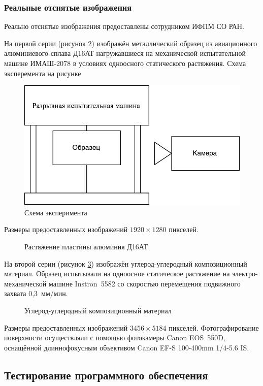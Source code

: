 \subsubsection{Реальные отснятые изображения}

Реально отснятые изображения предоставлены сотрудником ИФПМ СО РАН. 

На первой серии (рисунок \ref{pic:al_deform}) изображён металлический образец из авиационного алюминиевого сплава Д16АТ нагружавшиеся на механической испытательной машине ИМАШ-2078 в условиях одноосного статического растяжения. Схема эксперемента на рисунке 
\begin{figure}
\centering
\includegraphics[width=0.7\linewidth]{images/gap_mach-crop.pdf}
\caption{Схема эксперимента}
\label{fig:gap_mach}
\end{figure}
Размеры предоставленных изображений $1920\times1280$ пикселей.
\begin{figure}[ht]
\caption{Растяжение пластины алюминия Д16АТ}
\label{pic:al_deform}
\end{figure}

На второй серии (рисунок \ref{pic:carbon_deform}) изображён углерод-углеродный композиционный материал. Образец испытывали на одноосное статическое растяжение на электро-механической машине Instron 5582 со скоростью перемещения подвижного захвата 0,3 мм/мин.
\begin{figure}[h!]
\caption{Углерод-углеродный композиционный материал}
\label{pic:carbon_deform}
\end{figure}
Размеры предоставленных изображений $3456\times5184$ пикселей.
Фотографирование поверхности осуществляли с помощью фотокамеры Canon EOS 550D, оснащённой длиннофокусным объективом Canon EF-S 100-400mm 1/4-5.6 IS.



\subsection{Тестирование программного обеспечения}
